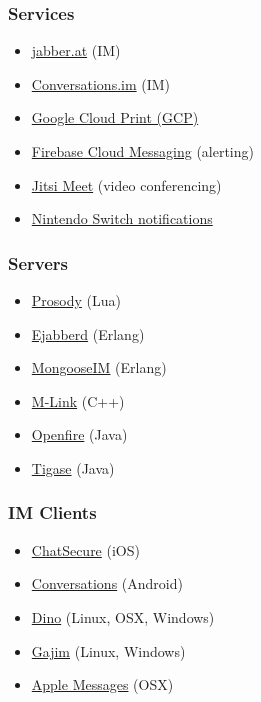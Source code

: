 \documentclass[xelatex,aspectratio=169]{beamer}
\begin{document}
\begin{frame}
	\frametitle{Services}
	\begin{itemize}
		\item\href{https://jabber.at/}{jabber.at} (IM)
		\item\href{https://account.conversations.im/}{Conversations.im} (IM)
		\item\href{https://developers.google.com/cloud-print/docs/rawxmpp}{Google Cloud Print (GCP)}
		\item\href{https://firebase.google.com/docs/cloud-messaging/server}{Firebase
			Cloud Messaging} (alerting)
		\item\href{https://meet.jit.si/}{Jitsi Meet} (video conferencing)
		\item\href{https://twitter.com/Midar3/status/839059229289943041}{Nintendo Switch notifications}
	\end{itemize}
\end{frame}

\begin{frame}
	\frametitle{Servers}
	\begin{itemize}
		\item\href{https://prosody.im/}{Prosody} (Lua)
		\item\href{https://www.ejabberd.im/}{Ejabberd} (Erlang)
		\item\href{https://www.erlang-solutions.com/products/mongooseim.html}{MongooseIM}
			(Erlang)
		\item\href{https://isode.com/products/m-link.html}{M-Link} (C++)
		\item\href{http://igniterealtime.org/projects/openfire/index.jsp}{Openfire}
			(Java)
		\item\href{http://tigase.net/content/tigase-xmpp-server}{Tigase} (Java)
	\end{itemize}
\end{frame}

\begin{frame}
	\frametitle{IM Clients}
	\begin{itemize}
		\item\href{https://chatsecure.org/}{ChatSecure} (iOS)
		\item\href{https://conversations.im/}{Conversations} (Android)
		\item\href{https://github.com/dino/dino}{Dino} (Linux, OSX, Windows)
		\item\href{https://gajim.org/}{Gajim} (Linux, Windows)
		\item\href{https://support.apple.com/explore/messages}{Apple Messages} (OSX)
	\end{itemize}
\end{frame}
\end{document}
